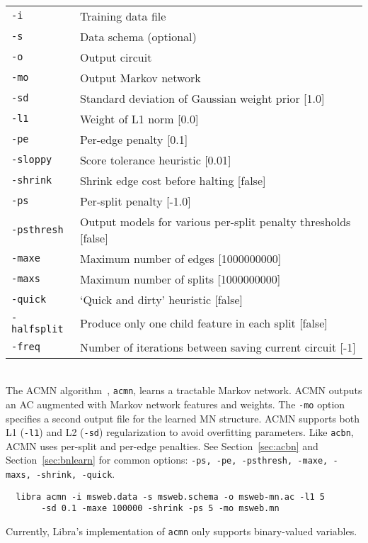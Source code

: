 \documentclass[11pt]{article}
\begin{document}
\noindent {} \\
\begin{tabular}{ll}
{\tt -i} &          Training data file \\
{\tt -s} &          Data schema (optional) \\
{\tt -o} &          Output circuit \\
{\tt -mo} &         Output Markov network \\
{\tt -sd} &         Standard deviation of Gaussian weight prior [1.0] \\
{\tt -l1} &         Weight of L1 norm [0.0] \\
{\tt -pe} &         Per-edge penalty [0.1] \\
{\tt -sloppy} &     Score tolerance heuristic [0.01] \\
{\tt -shrink} &     Shrink edge cost before halting [false] \\
{\tt -ps} &         Per-split penalty [-1.0] \\
{\tt -psthresh} &   Output models for various per-split penalty thresholds [false] \\
{\tt -maxe} &       Maximum number of edges [1000000000] \\
{\tt -maxs} &       Maximum number of splits [1000000000] \\
{\tt -quick} &      `Quick and dirty' heuristic [false] \\
{\tt -halfsplit} &  Produce only one child feature in each split [false] \\
{\tt -freq} &       Number of iterations between saving current circuit [-1] \\
\end{tabular} \\


The ACMN algorithm~\cite{lowd&rooshenas13}, {\tt acmn},
learns a tractable Markov network. ACMN outputs an AC augmented with
Markov network features and weights.  The {\tt -mo} option specifies a
second output file for the learned MN structure.  ACMN
supports both L1 ({\tt -l1}) and L2 ({\tt -sd}) regularization
to avoid overfitting parameters. Like {\tt acbn}, ACMN uses per-split
and per-edge penalties. See Section~\ref{sec:acbn} and
Section~\ref{sec:bnlearn} for common options: {\tt -ps, -pe,
-psthresh, -maxe, -maxs, -shrink, -quick}.
\begin{verbatim}
  libra acmn -i msweb.data -s msweb.schema -o msweb-mn.ac -l1 5
       -sd 0.1 -maxe 100000 -shrink -ps 5 -mo msweb.mn
\end{verbatim}
Currently, Libra's implementation of {\tt acmn} only supports
binary-valued variables.
\end{document}
